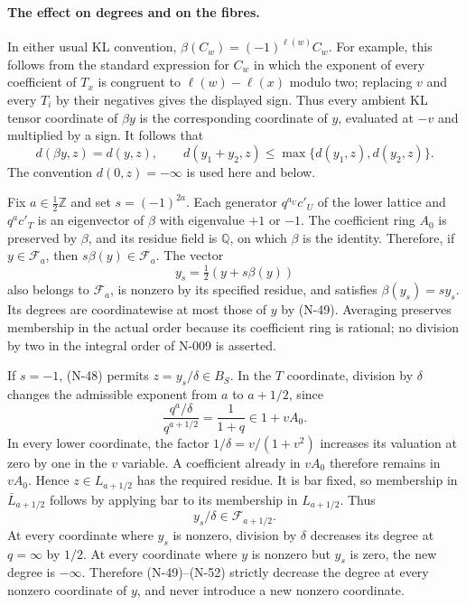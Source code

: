 \paragraph{The effect on degrees and on the fibres.}
In either usual KL convention,
$\beta(C_w)=(-1)^{\ell(w)}C_w$.  For example, this follows
from the standard expression for $C_w$ in which the exponent
of every coefficient of $T_x$ is congruent to
$\ell(w)-\ell(x)$ modulo two; replacing $v$ and every $T_i$
by their negatives gives the displayed sign.  Thus every
ambient KL tensor coordinate of $\beta y$ is the corresponding
coordinate of $y$, evaluated at $-v$ and multiplied by a sign.
It follows that
\[
 d(\beta y,z)=d(y,z),\qquad
 d(y_1+y_2,z)\le\max\{d(y_1,z),d(y_2,z)\}.
 \tag{N-49}
\]
The convention $d(0,z)=-\infty$ is used here and below.

Fix $a\in\tfrac12\mathbb Z$ and set $s=(-1)^{2a}$.
Each generator $q^{a_U}c'_U$ of the lower lattice and
$q^ac'_T$ is an eigenvector of $\beta$ with eigenvalue $+1$
or $-1$.  The coefficient ring $A_0$ is preserved by $\beta$,
and its residue field is $\mathbb Q$, on which $\beta$ is the
identity.  Therefore, if $y\in\mathcal F_a$, then
$s\beta(y)\in\mathcal F_a$.  The vector
\[
                   y_s=\tfrac12(y+s\beta(y))
 \tag{N-50}
\]
also belongs to $\mathcal F_a$, is nonzero by its specified
residue, and satisfies $\beta(y_s)=s y_s$.
Its degrees are coordinatewise at most those of $y$ by
(N-49).  Averaging preserves membership in the actual order
because its coefficient ring is rational; no division by two
in the integral order of N-009 is asserted.

If $s=-1$, (N-48) permits $z=y_s/\delta\in B_S$.
In the $T$ coordinate, division by $\delta$ changes the
admissible exponent from $a$ to $a+1/2$, since
\[
 \frac{q^a/\delta}{q^{a+1/2}}=\frac1{1+q}\in1+vA_0.
 \tag{N-51}
\]
In every lower coordinate, the factor
$1/\delta=v/(1+v^2)$ increases its valuation at zero by one
in the $v$ variable.  A coefficient already in $vA_0$
therefore remains in $vA_0$.  Hence $z\in L_{a+1/2}$ has the
required residue.  It is bar fixed, so membership in
$\bar L_{a+1/2}$ follows by applying bar to its membership
in $L_{a+1/2}$.  Thus
\[
                 y_s/\delta\in\mathcal F_{a+1/2}.
 \tag{N-52}
\]
At every coordinate where $y_s$ is nonzero, division by
$\delta$ decreases its degree at $q=\infty$ by $1/2$.
At every coordinate where $y$ is nonzero but $y_s$ is zero,
the new degree is $-\infty$.  Therefore (N-49)--(N-52)
strictly decrease the degree at every nonzero coordinate of
$y$, and never introduce a new nonzero coordinate.

